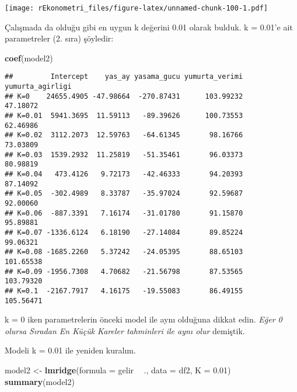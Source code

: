 \documentclass[
]{book}
\newenvironment{Shaded}{\begin{snugshade}}{\end{snugshade}}
\newcommand{\DataTypeTok}[1]{\textcolor[rgb]{0.13,0.29,0.53}{#1}}
\newcommand{\FloatTok}[1]{\textcolor[rgb]{0.00,0.00,0.81}{#1}}
\newcommand{\KeywordTok}[1]{\textcolor[rgb]{0.13,0.29,0.53}{\textbf{#1}}}
\newcommand{\NormalTok}[1]{#1}
\newcommand{\OperatorTok}[1]{\textcolor[rgb]{0.81,0.36,0.00}{\textbf{#1}}}
\newcommand{\StringTok}[1]{\textcolor[rgb]{0.31,0.60,0.02}{#1}}
\begin{document}
\texttt{[image: rEkonometri\_files/figure-latex/unnamed-chunk-100-1.pdf]}

Çalışmada da olduğu gibi en uygun k değerini 0.01 olarak bulduk. k = 0.01'e ait parametreler (2. sıra) şöyledir:

\begin{Shaded}
\begin{Highlighting}[]
\KeywordTok{coef}\NormalTok{(model2)}
\end{Highlighting}
\end{Shaded}

\begin{verbatim}
##         Intercept    yas_ay yasama_gucu yumurta_verimi yumurta_agirligi
## K=0    24655.4905 -47.98664  -270.87431      103.99232         47.18072
## K=0.01  5941.3695  11.59113   -89.39626      100.73553         62.46986
## K=0.02  3112.2073  12.59763   -64.61345       98.16766         73.03809
## K=0.03  1539.2932  11.25819   -51.35461       96.03373         80.98819
## K=0.04   473.4126   9.72173   -42.46333       94.20393         87.14092
## K=0.05  -302.4989   8.33787   -35.97024       92.59687         92.00060
## K=0.06  -887.3391   7.16174   -31.01780       91.15870         95.89881
## K=0.07 -1336.6124   6.18190   -27.14084       89.85224         99.06321
## K=0.08 -1685.2260   5.37242   -24.05395       88.65103        101.65538
## K=0.09 -1956.7308   4.70682   -21.56798       87.53565        103.79320
## K=0.1  -2167.7917   4.16175   -19.55083       86.49155        105.56471
\end{verbatim}

k = 0 iken parametrelerin önceki model ile aynı olduğuna dikkat edin. \emph{Eğer 0 olursa Sıradan En Küçük Kareler tahminleri ile aynı olur} demiştik.

Modeli k = 0.01 ile yeniden kuralım.

\begin{Shaded}
\begin{Highlighting}[]
\NormalTok{model2 <-}\StringTok{ }\KeywordTok{lmridge}\NormalTok{(}\DataTypeTok{formula =}\NormalTok{ gelir }\OperatorTok{~}\StringTok{ }\NormalTok{., }\DataTypeTok{data =}\NormalTok{ df2, }\DataTypeTok{K =} \FloatTok{0.01}\NormalTok{)}
\KeywordTok{summary}\NormalTok{(model2)}
\end{Highlighting}
\end{Shaded}
\end{document}
